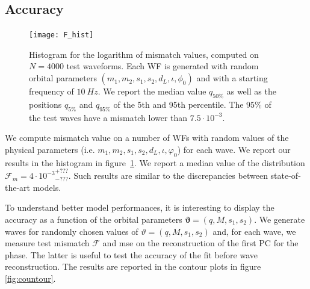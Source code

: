 \subsection{Accuracy}
\begin{figure}
	\centering
    \texttt{[image: F\_hist]}
	\caption{Histogram for the logarithm of mismatch values, computed on $N=4000$ test waveforms. Each WF is generated with random orbital parameters $(m_1,m_2, s_1, s_2, d_L, \iota, \phi_0)$ and with a starting frequency of $\SI{10}{Hz}$.
We report the median value $q_{50\%}$ as well as the positions $q_{5\%}$ and $q_{95\%}$ of the 5th and 95th percentile.
The $95\%$ of the test waves have a mismatch lower than $7.5 \cdot 10^{-3}$.
}
	\label{fig:F_hist}
\end{figure}
We compute mismatch value on a number of WFs with random values of the physical parameters (i.e. $m_1,m_2, s_1, s_2, d_L, \iota, \varphi_0$) for each wave.
We report our results in the histogram in figure~\ref{fig:F_hist}.
We report a median value of the distribution $\mathcal{F}_m = 4 \cdot {10^{-3}}^{+???}_{-???}$. Such results are similar to the discrepancies between state-of-the-art models.
\par
To understand better model performances, it is interesting to display the accuracy as a function of the orbital parameters $\boldsymbol{\vartheta} = (q,M,s_1,s_2)$.
We generate waves for randomly chosen values of $\vartheta = (q, M, s_1, s_2)$ and, for each wave, we measure test mismatch $\mathcal{F}$ and mse on the reconstruction of the first PC for the phase.
The latter is useful to test the accuracy of the fit before wave reconstruction.
The results are reported in the contour plots in figure \ref{fig:countour}.
\par

